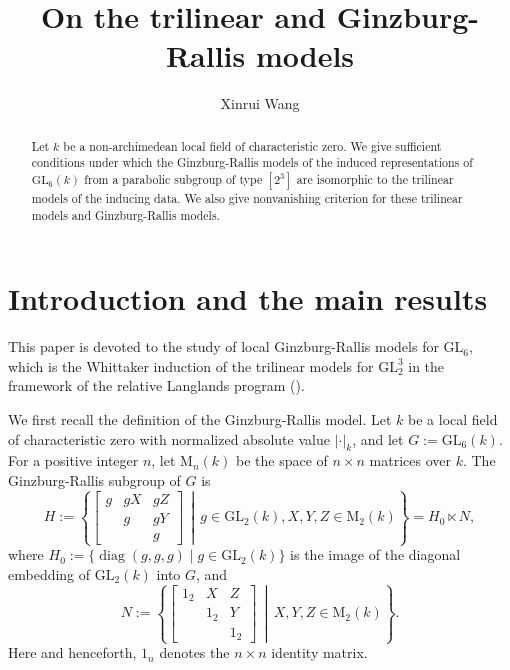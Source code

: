 \documentclass[12pt]{amsart}
\newcommand{\RM}{{\mathrm {M}}}
\newcommand{\GL}{{\mathrm{GL}}}
\newcommand{\diag}{\operatorname{diag}}
\newcommand{\absk}[1]{\left\lvert#1\right\rvert_k}
\theoremstyle{Theorem}
\theoremstyle{Theorem}
\theoremstyle{Theorem}
\theoremstyle{Theorem}
\theoremstyle{Plain}
\theoremstyle{remark}
\theoremstyle{remark}
\theoremstyle{Definition}
\begin{document}
\title[Trilinear and Ginzburg-Rallis models]{On the trilinear and Ginzburg-Rallis models}
\author[X. Wang]{Xinrui Wang}
\address{School of Mathematical Sciences, Zhejiang University, Hangzhou, Zhejiang, P. R. China}


\begin{abstract}
    Let $k$ be a non-archimedean local field of characteristic zero. We give sufficient conditions under which the Ginzburg-Rallis models of the induced representations of $\GL_6(k)$  from a parabolic subgroup of type $[2^3]$ are isomorphic to the  trilinear models of the inducing data. We also give nonvanishing criterion for these
    trilinear models and Ginzburg-Rallis models.
\end{abstract}

\maketitle
\tableofcontents

\section{Introduction and the main results}

This paper is devoted to the study of local Ginzburg-Rallis models for $\GL_6$, which is the Whittaker induction of the trilinear models for $\GL_2^3$ in the framework of the 
relative Langlands program (\cite{BZSV}). 

We first recall the definition of the Ginzburg-Rallis model. Let $k$ be a local field of characteristic zero with normalized absolute value $\absk{\cdot}$, and let $ G := \GL_6(k) $. For a positive integer $n$, let $\RM_n(k)$ be the space of $n\times n$ matrices over $k$. The Ginzburg-Rallis subgroup of $G$ is
\[
    H := \left\{
    \begin{bmatrix}
        g & gX & gZ\\
          & g  & gY\\
          &    & g
    \end{bmatrix}
    \, \middle|\, g \in \GL_2(k), X, Y, Z \in \RM_2(k) \right\} = H_0 \ltimes N,
\]
where $ H_0 := \{ \diag(g, g, g) \mid g \in \GL_2(k) \} $ is the image of the diagonal embedding of $\GL_2(k)$ into $G$,  and 
\[
    N := \left\{
    \begin{bmatrix}
        1_2 & X   & Z  \\
            & 1_2 & Y  \\
            &     & 1_2
    \end{bmatrix}
    \, \middle| \, X, Y, Z \in \RM_2(k) \right\}.
\]
Here and henceforth, $1_n$ denotes the $ n \times n $ identity matrix.
\end{document}
